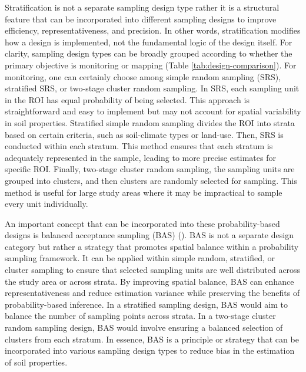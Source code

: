 \documentclass[
  10pt,
  b5paper,
  oneside]{book}
\begin{document}
Stratification is not a separate sampling design type rather it is a structural feature that can be incorporated into different sampling designs to improve efficiency, representativeness, and precision. In other words, stratification modifies how a design is implemented, not the fundamental logic of the design itself. For clarity, sampling design types can be broadly grouped according to whether the primary objective is monitoring or mapping (Table \ref{tab:design-comparison}). For monitoring, one can certainly choose among simple random sampling (SRS), stratified SRS, or two-stage cluster random sampling. In SRS, each sampling unit in the ROI has equal probability of being selected. This approach is straightforward and easy to implement but may not account for spatial variability in soil properties. Stratified simple random sampling divides the ROI into strata based on certain criteria, such as soil-climate types or land-use. Then, SRS is conducted within each stratum. This method ensures that each stratum is adequately represented in the sample, leading to more precise estimates for specific ROI. Finally, two-stage cluster random sampling, the sampling units are grouped into clusters, and then clusters are randomly selected for sampling. This method is useful for large study areas where it may be impractical to sample every unit individually.

An important concept that can be incorporated into these probability-based designs is balanced acceptance sampling (BAS) (). BAS is not a separate design category but rather a strategy that promotes spatial balance within a probability sampling framework. It can be applied within simple random, stratified, or cluster sampling to ensure that selected sampling units are well distributed across the study area or across strata. By improving spatial balance, BAS can enhance representativeness and reduce estimation variance while preserving the benefits of probability-based inference. In a stratified sampling design, BAS would aim to balance the number of sampling points across strata. In a two-stage cluster random sampling design, BAS would involve ensuring a balanced selection of clusters from each stratum. In essence, BAS is a principle or strategy that can be incorporated into various sampling design types to reduce bias in the estimation of soil properties.
\end{document}
